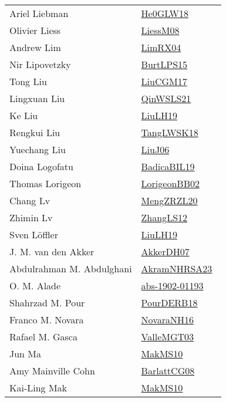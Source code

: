 {\begin{longtable}{p{4cm}p{20cm}}
Ariel Liebman & \href{works/He0GLW18.pdf}{He0GLW18}~\cite{He0GLW18}\\
Olivier Liess & \href{works/LiessM08.pdf}{LiessM08}~\cite{LiessM08}\\
Andrew Lim & \href{works/LimRX04.pdf}{LimRX04}~\cite{LimRX04}\\
Nir Lipovetzky & \href{works/BurtLPS15.pdf}{BurtLPS15}~\cite{BurtLPS15}\\
Tong Liu & \href{works/LiuCGM17.pdf}{LiuCGM17}~\cite{LiuCGM17}\\
Lingxuan Liu & \href{works/QinWSLS21.pdf}{QinWSLS21}~\cite{QinWSLS21}\\
Ke Liu & \href{works/LiuLH19.pdf}{LiuLH19}~\cite{LiuLH19}\\
Rengkui Liu & \href{works/TangLWSK18.pdf}{TangLWSK18}~\cite{TangLWSK18}\\
Yuechang Liu & \href{works/LiuJ06.pdf}{LiuJ06}~\cite{LiuJ06}\\
Doina Logofatu & \href{works/BadicaBIL19.pdf}{BadicaBIL19}~\cite{BadicaBIL19}\\
Thomas Lorigeon & \href{works/LorigeonBB02.pdf}{LorigeonBB02}~\cite{LorigeonBB02}\\
Chang Lv & \href{works/MengZRZL20.pdf}{MengZRZL20}~\cite{MengZRZL20}\\
Zhimin Lv & \href{works/ZhangLS12.pdf}{ZhangLS12}~\cite{ZhangLS12}\\
Sven L{\"{o}}ffler & \href{works/LiuLH19.pdf}{LiuLH19}~\cite{LiuLH19}\\
J. M. van den Akker & \href{works/AkkerDH07.pdf}{AkkerDH07}~\cite{AkkerDH07}\\
Abdulrahman M. Abdulghani & \href{works/AkramNHRSA23.pdf}{AkramNHRSA23}~\cite{AkramNHRSA23}\\
O. M. Alade & \href{works/abs-1902-01193.pdf}{abs-1902-01193}~\cite{abs-1902-01193}\\
Shahrzad M. Pour & \href{works/PourDERB18.pdf}{PourDERB18}~\cite{PourDERB18}\\
Franco M. Novara & \href{works/NovaraNH16.pdf}{NovaraNH16}~\cite{NovaraNH16}\\
Rafael M. Gasca & \href{works/ValleMGT03.pdf}{ValleMGT03}~\cite{ValleMGT03}\\
Jun Ma & \href{works/MakMS10.pdf}{MakMS10}~\cite{MakMS10}\\
Amy Mainville Cohn & \href{works/BarlattCG08.pdf}{BarlattCG08}~\cite{BarlattCG08}\\
Kai{-}Ling Mak & \href{works/MakMS10.pdf}{MakMS10}~\cite{MakMS10}\\

\end{longtable}}
